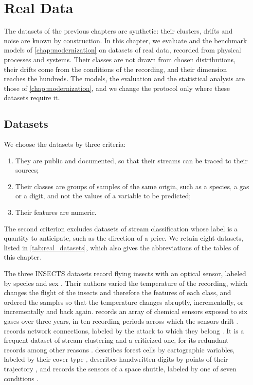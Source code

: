 \chapter{Real Data}
\label{chap:real_data}

The datasets of the previous chapters are synthetic: their clusters, drifts and noise are known by construction. In this chapter, we evaluate \MicroTEDAClusPlus and the benchmark models of \cref{chap:modernization} on datasets of real data, recorded from physical processes and systems. Their classes are not drawn from chosen distributions, their drifts come from the conditions of the recording, and their dimension reaches the hundreds. The models, the evaluation and the statistical analysis are those of \cref{chap:modernization}, and we change the protocol only where these datasets require it.

\section{Datasets}
\label{sec:real_datasets}

We choose the datasets by three criteria:

\begin{enumerate}
    \item They are public and documented, so that their streams can be traced to their sources;
    \item Their classes are groups of samples of the same origin, such as a species, a gas or a digit, and not the values of a variable to be predicted;
    \item Their features are numeric.
\end{enumerate}

The second criterion excludes datasets of stream classification whose label is a quantity to anticipate, such as the direction of a price. We retain eight datasets, listed in \cref{tab:real_datasets}, which also gives the abbreviations of the tables of this chapter.



The three INSECTS datasets record flying insects with an optical sensor, labeled by species and sex \cite{souza2020challenges}. Their authors varied the temperature of the recording, which changes the flight of the insects and therefore the features of each class, and ordered the samples so that the temperature changes abruptly, incrementally, or incrementally and back again. \GasDrift records an array of chemical sensors exposed to six gases over three years, in ten recording periods across which the sensors drift \cite{vergara2012chemical}. \KDDCup records network connections, labeled by the attack to which they belong \cite{kddcup1999}. It is a frequent dataset of stream clustering \cite{aggarwal2003framework,cao2006density} and a criticized one, for its redundant records among other reasons \cite{tavallaee2009detailed}. \Covertype describes forest cells by cartographic variables, labeled by their cover type \cite{blackard1999comparative}, \Pendigits describes handwritten digits by points of their trajectory \cite{alpaydin1996pen}, and \Shuttle records the sensors of a space shuttle, labeled by one of seven conditions \cite{statlog_shuttle}.

